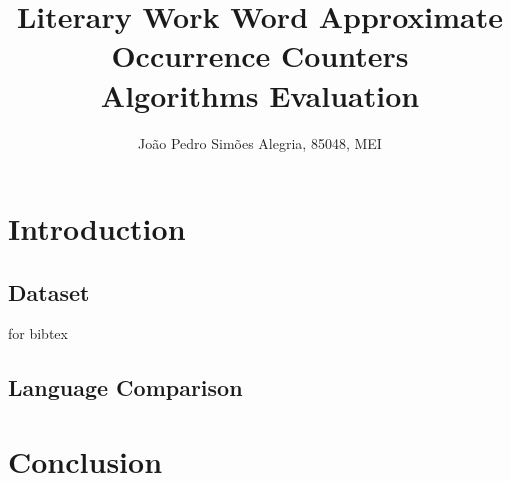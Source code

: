 \documentclass[]{revdetua}
\begin{document}

\title{Literary Work Word Approximate Occurrence Counters \\ Algorithms Evaluation}
\author{João Pedro Simões Alegria, 85048, MEI} %
\maketitle

\begin{abstract}
\end{abstract}


\begin{keywords}%
\end{keywords}

\section{Introduction}

\subsection{Dataset}
for bibtex \cite{gutenberg}

\subsection{Language Comparison}


\section{Conclusion}

\end{document}
